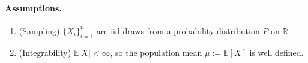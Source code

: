 
\paragraph{Assumptions.}
\begin{enumerate}
\item[\textbf{A1.}] (Sampling) $\{X_i\}_{i=1}^n$ are iid draws from a probability distribution $P$ on $\mathbb{R}$.
\item[\textbf{A2.}] (Integrability) $\mathbb{E}|X| < \infty$, so the population mean $\mu := \mathbb{E}[X]$ is well defined.
\end{enumerate}
